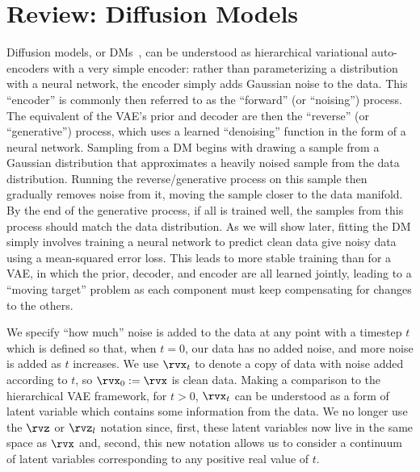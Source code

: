 \chapter{Review: Diffusion Models}
\label{sec:diffusion}

Diffusion models, or DMs~\citep{sohl2015deep,ho2020denoising,nichol2021improved,song2020score}, can be understood as hierarchical variational auto-encoders with a very simple encoder: rather than parameterizing a distribution with a neural network, the encoder simply adds Gaussian noise to the data. This ``encoder'' is commonly then referred to as the ``forward'' (or ``noising'') process. The equivalent of the VAE's prior and decoder are then the ``reverse'' (or ``generative'') process, which uses a learned ``denoising'' function in the form of a neural network. Sampling from a DM begins with drawing a sample from a Gaussian distribution that approximates a heavily noised sample from the data distribution. Running the reverse/generative process on this sample then gradually removes noise from it, moving the sample closer to the data manifold. By the end of the generative process, if all is trained well, the samples from this process should match the data distribution. As we will show later, fitting the DM simply involves training a neural network to predict clean data give noisy data using a mean-squared error loss. This leads to more stable training than for a VAE, in which the prior, decoder, and encoder are all learned jointly, leading to a ``moving target'' problem as each component must keep compensating for changes to the others.

We specify ``how much'' noise is added to the data at any point with a timestep $t$ which is defined so that, when $t=0$, our data has no added noise, and more noise is added as $t$ increases. We use $\rvx_t$ to denote a copy of data with noise added according to $t$, so $\rvx_0 := \rvx$ is clean data. Making a comparison to the hierarchical VAE framework, for $t>0$, $\rvx_t$ can be understood as a form of latent variable which contains some information from the data. We no longer use the $\rvz$ or $\rvz_l$ notation since, first, these latent variables now live in the same space as $\rvx$ and, second, this new notation allows us to consider a continuum of latent variables corresponding to any positive real value of $t$.


